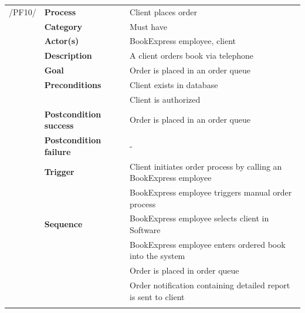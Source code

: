 \documentclass[11pt,a4paper,oneside,svgnames]{report}
\begin{document}
\noindent
\begin{tabular}{p{1.5cm}p{3cm}p{8cm}}
\cellcolor{white}	 /PF10/	& \textbf{Process} & Client places order\\ 
\cellcolor{white}		& \textbf{Category} & Must have\\
\cellcolor{white}		& \textbf{Actor(s)} & BookExpress employee, client\\ 
\cellcolor{white}		& \textbf{Description}	 & A client orders book via telephone\\ 
\cellcolor{white}		& \textbf{Goal} & Order is placed in an order queue\\
\cellcolor{white}		& \textbf{Preconditions} & Client exists in database\\
\cellcolor{white}		& & Client is authorized\\
\cellcolor{white}		& \textbf{Postcondition success} & Order is placed in an order queue\\
\cellcolor{white}		& \textbf{Postcondition failure} & -\\
\cellcolor{white}		& \textbf{Trigger} & Client initiates order process by calling an BookExpress employee\\
\cellcolor{white}		& & BookExpress employee triggers manual order process\\
\cellcolor{white}		& \textbf{Sequence} & BookExpress employee selects client in Software\\
\cellcolor{white}		& & BookExpress employee enters ordered book into the system\\
\cellcolor{white}		& & Order is placed in order queue\\
\cellcolor{white}		& & Order notification containing detailed report is sent to client\\
\cellcolor{white}\hfill \\
\end{tabular}
\end{document}
